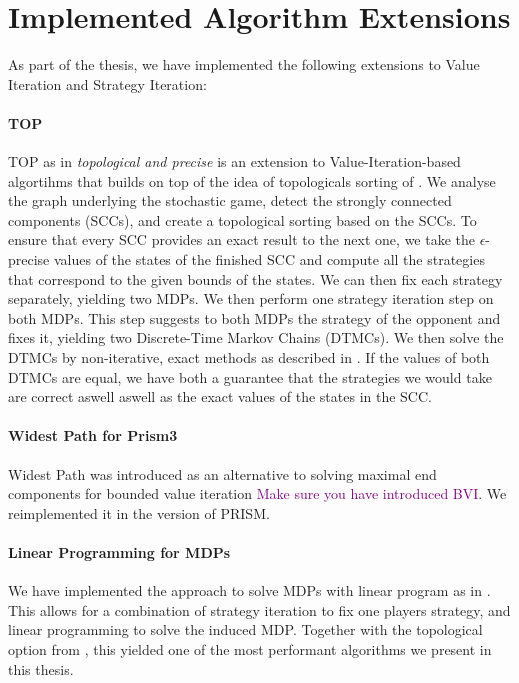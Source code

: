 \chapter{Implemented Algorithm Extensions} \label{ch:implementedAlgos}
As part of the thesis, we have implemented the following extensions to Value Iteration and Strategy Iteration:

\subsubsection*{TOP} TOP as in \emph{topological and precise} is an extension to Value-Iteration-based algortihms that builds on top of the idea of topologicals sorting of \cite{Gandalf}.
We analyse the graph underlying the stochastic game, detect the strongly connected components (SCCs), and create a topological sorting based on the SCCs.
To ensure that every SCC provides an exact result to the next one, we take the $\epsilon$-precise values of the states of the finished SCC and compute all the
strategies that correspond to the given bounds of the states.
We can then fix each strategy separately, yielding two MDPs. We then perform one strategy iteration step on both MDPs. This step suggests to both MDPs the strategy
of the opponent and fixes it, yielding two Discrete-Time Markov Chains (DTMCs). We then solve the DTMCs by non-iterative, exact methods as described in \cite{BaierBook}.
If the values of both DTMCs are equal, we have both a guarantee that the strategies we would take are correct aswell aswell as the exact values of the states in the SCC.

\subsubsection*{Widest Path for Prism3}
Widest Path was introduced as an alternative to solving maximal end components for bounded value iteration \textcolor{purple}{Make sure you have introduced BVI}\cite*{WidestPath}.
We reimplemented it in the version of PRISM.

\subsubsection*{Linear Programming for MDPs}
We have implemented the approach to solve MDPs with linear program as in \cite{ANY BOOK}. 
This allows for a combination of strategy iteration to fix one players strategy, and linear programming to solve the induced MDP.
Together with the topological option from \cite{GANDALF}, this yielded one of the most performant algorithms we present in this thesis.
